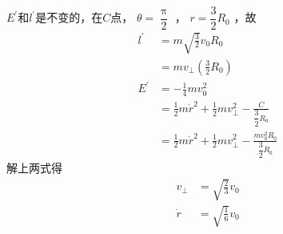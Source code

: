 \documentclass[../outline-of-mechanics.tex]{subfiles}
\begin{document}
\clearpage\noindent $ E ^ { \prime } $和$ l ^ { \prime } $是不变的，在$ C $点， $ \theta = \dfrac { \uppi } { 2 } $ ， $ r = \dfrac { 3 } { 2 } R _ { 0 } $ ，故
\begin{equation*}
  \begin{split}
    l ^ { \prime } &= m \sqrt { \frac { 3 } { 2 } } v _ { 0 } R _ { 0 } \\
    &= m v _ { \bot } \left( \frac { 3 } { 2 } R _ { 0 } \right) \\
    E ^ { \prime } &= - \frac { 1 } { 4 } m v _ 0 ^ { 2 } \\
    &= \frac { 1 } { 2 } m \dot { r } ^ { 2 } + \frac { 1 } { 2 } m v _ { \bot } ^ { 2 } - \frac { C } { \dfrac { 3 } { 2 } R _ { 0 } } \\
    &= \frac { 1 } { 2 } m \dot { r } ^ { 2 } + \frac { 1 } { 2 } m v _ { \bot } ^ { 2 } - \frac { m v _ 0 ^ 2 R _ 0 } { \dfrac { 3 } { 2 } R _ { 0 } }
  \end{split}
\end{equation*}
解上两式得
\begin{equation*}
  \begin{split}
    v _ { \bot } &= \sqrt { \frac { 2 } { 3 } } v _ { 0 } \\
    \dot { r } &= \sqrt { \frac { 1 } { 6 } } v _ { 0 }
  \end{split}
\end{equation*}
\end{document}

